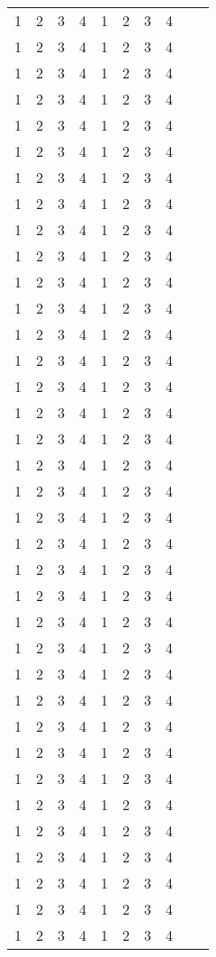\documentclass[12pt]{article}
\begin{document}
\begin{center}
\begin{longtable}{llllllllll}
1 & 2 & 3 & 4 & 1 & 2 & 3 & 4 \\ 1 & 2 & 3 & 4 & 1 & 2 & 3 & 4 \\ 1 & 2 & 3 & 4 & 1 & 2 & 3 & 4 \\ 1 & 2 & 3 & 4 & 1 & 2 & 3 & 4 \\
1 & 2 & 3 & 4 & 1 & 2 & 3 & 4 \\ 1 & 2 & 3 & 4 & 1 & 2 & 3 & 4 \\ 1 & 2 & 3 & 4 & 1 & 2 & 3 & 4 \\ 1 & 2 & 3 & 4 & 1 & 2 & 3 & 4 \\
1 & 2 & 3 & 4 & 1 & 2 & 3 & 4 \\ 1 & 2 & 3 & 4 & 1 & 2 & 3 & 4 \\ 1 & 2 & 3 & 4 & 1 & 2 & 3 & 4 \\ 1 & 2 & 3 & 4 & 1 & 2 & 3 & 4 \\
1 & 2 & 3 & 4 & 1 & 2 & 3 & 4 \\ 1 & 2 & 3 & 4 & 1 & 2 & 3 & 4 \\ 1 & 2 & 3 & 4 & 1 & 2 & 3 & 4 \\ 1 & 2 & 3 & 4 & 1 & 2 & 3 & 4 \\
1 & 2 & 3 & 4 & 1 & 2 & 3 & 4 \\ 1 & 2 & 3 & 4 & 1 & 2 & 3 & 4 \\ 1 & 2 & 3 & 4 & 1 & 2 & 3 & 4 \\ 1 & 2 & 3 & 4 & 1 & 2 & 3 & 4 \\
1 & 2 & 3 & 4 & 1 & 2 & 3 & 4 \\ 1 & 2 & 3 & 4 & 1 & 2 & 3 & 4 \\ 1 & 2 & 3 & 4 & 1 & 2 & 3 & 4 \\ 1 & 2 & 3 & 4 & 1 & 2 & 3 & 4 \\
1 & 2 & 3 & 4 & 1 & 2 & 3 & 4 \\ 1 & 2 & 3 & 4 & 1 & 2 & 3 & 4 \\ 1 & 2 & 3 & 4 & 1 & 2 & 3 & 4 \\ 1 & 2 & 3 & 4 & 1 & 2 & 3 & 4 \\
1 & 2 & 3 & 4 & 1 & 2 & 3 & 4 \\ 1 & 2 & 3 & 4 & 1 & 2 & 3 & 4 \\ 1 & 2 & 3 & 4 & 1 & 2 & 3 & 4 \\ 1 & 2 & 3 & 4 & 1 & 2 & 3 & 4 \\
1 & 2 & 3 & 4 & 1 & 2 & 3 & 4 \\ 1 & 2 & 3 & 4 & 1 & 2 & 3 & 4 \\ 1 & 2 & 3 & 4 & 1 & 2 & 3 & 4 \\ 1 & 2 & 3 & 4 & 1 & 2 & 3 & 4 \\

\end{longtable}
\end{center}
\end{document}
